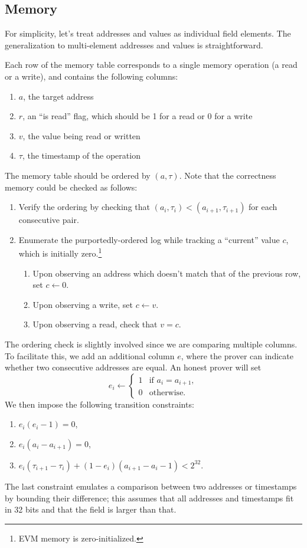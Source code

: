 \subsection{Memory}
\label{memory}

For simplicity, let's treat addresses and values as individual field elements. The generalization to multi-element addresses and values is straightforward.

Each row of the memory table corresponds to a single memory operation (a read or a write), and contains the following columns:

\begin{enumerate}
  \item $a$, the target address
  \item $r$, an ``is read'' flag, which should be 1 for a read or 0 for a write
  \item $v$, the value being read or written
  \item $\tau$, the timestamp of the operation
\end{enumerate}
The memory table should be ordered by $(a, \tau)$. Note that the correctness memory could be checked as follows:
\begin{enumerate}
  \item Verify the ordering by checking that $(a_i, \tau_i) < (a_{i+1}, \tau_{i+1})$ for each consecutive pair.
  \item Enumerate the purportedly-ordered log while tracking a ``current'' value $c$, which is initially zero.\footnote{EVM memory is zero-initialized.}
  \begin{enumerate}
    \item Upon observing an address which doesn't match that of the previous row, set $c \leftarrow 0$.
    \item Upon observing a write, set $c \leftarrow v$.
    \item Upon observing a read, check that $v = c$.
  \end{enumerate}
\end{enumerate}

The ordering check is slightly involved since we are comparing multiple columns. To facilitate this, we add an additional column $e$, where the prover can indicate whether two consecutive addresses are equal. An honest prover will set
$$
e_i \leftarrow \begin{cases}
  1 & \text{if } a_i = a_{i + 1}, \\
  0 & \text{otherwise}.
\end{cases}
$$
We then impose the following transition constraints:
\begin{enumerate}
  \item $e_i (e_i - 1) = 0$,
  \item $e_i (a_i - a_{i + 1}) = 0$,
  \item $e_i (\tau_{i + 1} - \tau_i) + (1 - e_i) (a_{i + 1} - a_i - 1) < 2^{32}$.
\end{enumerate}
The last constraint emulates a comparison between two addresses or timestamps by bounding their difference; this assumes that all addresses and timestamps fit in 32 bits and that the field is larger than that.

